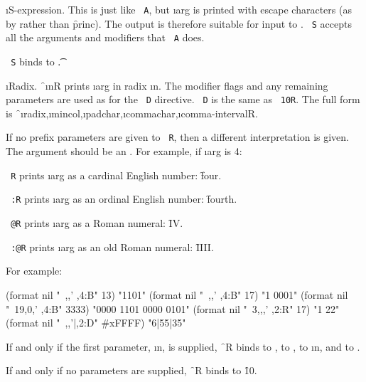 
\i{S-expression}.
This is just like {\tt ~A}, but \i{arg} is printed with escape
characters (as by  rather than \f{princ}).  The output is
therefore suitable for input to .  {\tt ~S} accepts
all the arguments and modifiers that {\tt ~A} does.

{\tt ~S} binds  to \t.


\i{Radix}.
\f{~\i{n}R} prints \i{arg} in radix \i{n}.
The modifier flags and any remaining parameters are used as for
the {\tt ~D} directive.
{\tt ~D} is the same as {\tt ~10R}.  
The full form is 
\f{~\i{radix},\i{mincol},\i{padchar},\i{commachar},\i{comma-interval}R}.

If no prefix parameters are given to {\tt ~R}, then a different
interpretation is given.  The argument should be an .
For example, if \i{arg} is 4:

\beginlist
\itemitem{\bull}
{\tt ~R} prints \i{arg} as a cardinal English number: \f{four}.


\itemitem{\bull}
{\tt ~:R} prints \i{arg} as an ordinal English number: \f{fourth}.

\itemitem{\bull}   
{\tt ~@R} prints \i{arg} as a Roman numeral: \f{IV}.

\itemitem{\bull}      
{\tt ~:@R} prints \i{arg} as an old Roman numeral: \f{IIII}.
\endlist

For example:

\code
 (format nil "~,,' ,4:B" 13) \EV "1101"
 (format nil "~,,' ,4:B" 17) \EV "1 0001"
 (format nil "~19,0,' ,4:B" 3333) \EV "0000 1101 0000 0101"
 (format nil "~3,,,' ,2:R" 17) \EV "1 22"
 (format nil "~,,'|,2:D" #xFFFF) \EV  "6|55|35"
\endcode
{}

If and only if the first parameter, \i{n}, is supplied,
\f{~R} binds
      to ,
      to , 
      to \i{n},
 and  to .

If and only if no parameters are supplied,
\f{~R} binds  to \f{10}.

